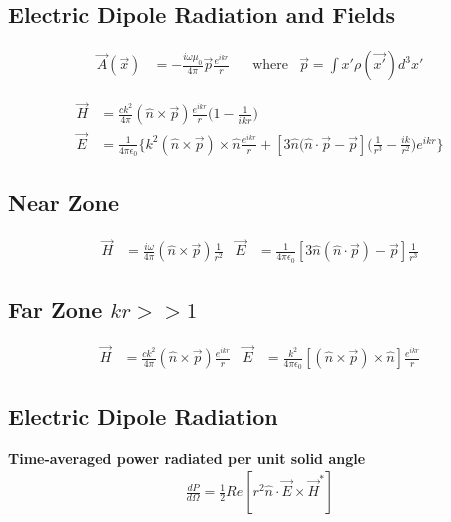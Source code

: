 \documentclass[a4paper, 11pt, landscape]{article}
\begin{document}
\begin{multicols*}{3}
\subsection{Electric Dipole Radiation and Fields}
\begin{compactenum}
    \begin{align*}
        \vec{A}(\vec{x}) &= -\frac{i\omega \mu_{0}}{4\pi} \vec{p} \frac{e^{ikr}}{r} && \text{where} & \vec{p} = \int x' \rho(\vec{x'}) d^{3}x'
    \end{align*}
    
    \begin{align*}
        \vec{H} &= \frac{ck^{2}}{4\pi} (\hat{n} \times \vec{p}) \frac{e^{ikr}}{r} \Bigg( 1 - \frac{1}{ikr}\Bigg) \\
        \vec{E} &= \frac{1}{4\pi \epsilon_{0}} \Bigg\{ k^{2}(\hat{n} \times \vec{p}) \times \hat{n} \frac{e^{ikr}}{r} + [3\hat{n}(\hat{n} \cdot \vec{p} - \vec{p}] \Bigg(\frac{1}{r^{3}} - \frac{ik}{r^{2}} \Bigg) e^{ikr} \Bigg\}
    \end{align*}
\end{compactenum}

\subsection{Near Zone}
\begin{compactenum}
    \begin{align*}
        \vec{H} &= \frac{i \omega}{4 \pi} ( \hat{n} \times \vec{p}) \frac{1}{r^{2}} & 
        \vec{E} &= \frac{1}{4\pi \epsilon_{0}} [3 \hat{n}(\hat{n} \cdot \vec{p}) - \vec{p}]\frac{1}{r^{3}}
    \end{align*}
\end{compactenum}

\subsection{Far Zone $kr >> 1$}
\begin{compactenum}
    \begin{align*}
        \vec{H} &= \frac{ck^{2}}{4 \pi} (\hat{n} \times \vec{p}) \frac{e^{ikr}}{r} &
        \vec{E} &= \frac{k^{2}}{4\pi \epsilon_{0}} [(\hat{n} \times \vec{p}) \times \hat{n}] \frac{e^{ikr}}{r}
        \end{align*}
\end{compactenum}

\subsection{Electric Dipole Radiation}
\begin{compactenum}
\textbf{Time-averaged power radiated per unit solid angle}
    \begin{align*}
        \frac{dP}{d \Omega} = \frac{1}{2} Re[r^{2}\hat{n} \cdot \vec{E} \times \vec{H}^{\big*}]
        \end{align*}
\end{compactenum}


\end{multicols*}
\end{document}
